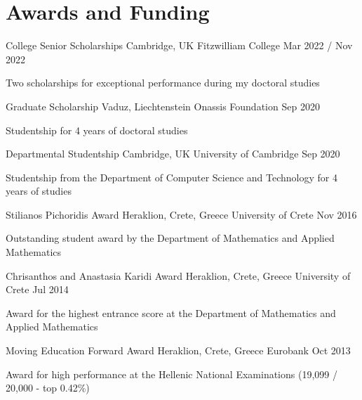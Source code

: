 \documentclass{academic-cv}
\begin{document}
\section*{Awards and Funding}
    \begin{cvlist}
        \cvheading
            {College Senior Scholarships}
            {Cambridge, UK}
            {Fitzwilliam College}
            {Mar 2022 / Nov 2022}
            {\begin{cvlist}
                \item Two scholarships for exceptional performance during my doctoral studies \end{cvlist}}
        \cvheading
            {Graduate Scholarship}
            {Vaduz, Liechtenstein}
            {Onassis Foundation}
            {Sep 2020}
            {\begin{cvlist}
                \item Studentship for 4 years of doctoral studies
            \end{cvlist}}
        \cvheading
            {Departmental Studentship}
            {Cambridge, UK}
            {University of Cambridge}
            {Sep 2020}
            {\begin{cvlist}
                \item Studentship from the Department of Computer Science and Technology for 4 years of studies
            \end{cvlist}}
        \cvheading
            {Stilianos Pichoridis Award}
            {Heraklion, Crete, Greece}
            {University of Crete}
            {Nov 2016}
            {\begin{cvlist}
                \item Outstanding student award by the Department of Mathematics and Applied Mathematics
            \end{cvlist}}
            \newpage
        \cvheading
            {Chrisanthos and Anastasia Karidi Award}
            {Heraklion, Crete, Greece}
            {University of Crete}
            {Jul 2014}
            {\begin{cvlist}
                \item Award for the highest entrance score at the Department of Mathematics and Applied Mathematics
            \end{cvlist}}
        \cvheading
            {Moving Education Forward Award}
            {Heraklion, Crete, Greece}
            {Eurobank}
            {Oct 2013}
            {\begin{cvlist}
                \item Award for high performance at the Hellenic National Examinations (19,099 / 20,000 - top 0.42\%)
            \end{cvlist}}
    \end{cvlist}
\end{document}
